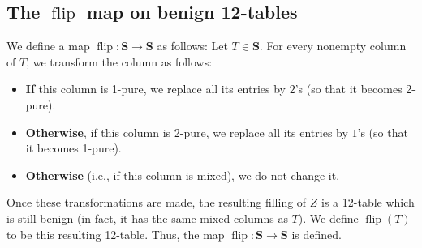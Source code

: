\documentclass[numbers=enddot,12pt,final,onecolumn,notitlepage]{scrartcl}%
\theoremstyle{definition}
\begin{document}
\subsection{The $\operatorname*{flip}$ map on benign 12-tables}

We define a map $\operatorname*{flip}:\mathbf{S}\rightarrow\mathbf{S}$ as
follows: Let $T\in\mathbf{S}$. For
every nonempty column of $T$, we
transform the column as follows:

\begin{itemize}
\item \textbf{If} this column is 1-pure, we replace all its entries by $2$'s
(so that it becomes 2-pure).

\item \textbf{Otherwise}, if this column is 2-pure, we replace all its entries by
$1$'s (so that it becomes 1-pure).

\item \textbf{Otherwise} (i.e., if this column is mixed), we do not change it.
\end{itemize}

Once these transformations are made, the resulting filling of $Z$
is a 12-table which is still benign (in fact, it has the same mixed
columns as $T$). We define $\operatorname*{flip}\left(
T\right)  $ to be this resulting 12-table. Thus, the map
$\operatorname*{flip}:\mathbf{S}\rightarrow\mathbf{S}$ is defined.
\end{document}
